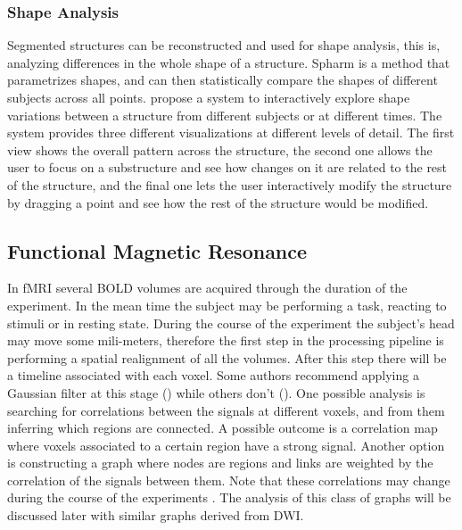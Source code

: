 \subsubsection{Shape Analysis}

Segmented structures can be reconstructed and used for shape analysis, this is, analyzing differences in the whole shape of a structure. 
Spharm \autocite{gerig_shape_2001} is a method that parametrizes shapes, and can then statistically compare the shapes of different subjects across all points.  \autocite{hermann_visual_2014} propose a system to interactively explore shape variations between a structure from different subjects or at different times. The system provides three different visualizations at different levels of detail. The first view shows the overall pattern across the structure, the second one allows the user to focus on a substructure and see how changes on it are related to the rest of the structure, and the final one lets the user interactively modify the structure by dragging a  point and see how the rest of the structure would be modified. 

\subsection{Functional Magnetic Resonance}

In fMRI several BOLD volumes are acquired through the duration of the experiment. In the mean time the subject may be performing a task, reacting to stimuli or in resting state. During the course of the experiment the subject's head may move some mili-meters, therefore the first step in the processing pipeline is performing a spatial realignment of all the volumes. After this step there will be a timeline associated with each voxel. Some authors recommend applying a Gaussian filter at this stage (\autocite{friston_statistical_2007}) while others don't (\autocite{goebel_brainvoyagerpast_2012}). One possible analysis is searching for correlations between the signals at different voxels, and from them inferring which regions are connected. A possible outcome is a correlation map where voxels associated to a certain region have a strong signal. Another option is constructing a graph where nodes are regions and links are weighted by the correlation of the signals between them. Note that these correlations may change during the course of the experiments \autocite{richiardi_decoding_2011}. The analysis of this class of graphs will be discussed later with similar graphs derived from DWI. 

